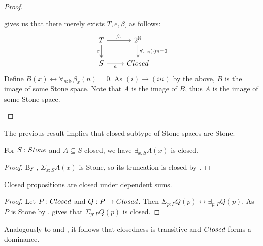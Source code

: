 \begin{proof}
\begin{itemize}
      gives us that there merely exists $T, e, \beta_\cdot$ as follows:
     \begin{equation}
       \begin{tikzcd}
         T \arrow[r,"\beta_\cdot"] \arrow[d, two heads,swap,"e"] & 2^\mathbb N 
         \arrow[d,two heads, "\forall_{n:\mathbb N} (\cdot)n = 0"] \\
         S \arrow[r,swap,"a"] & \Closed
       \end{tikzcd} 
     \end{equation} 
     Define $B(x) \leftrightarrow \forall_{n:\mathbb N} \beta_x(n) = 0$. 
     As $(i) \to (iii)$ by the above, $B$ is the image of some Stone space. 
     Note that $A$ is the image of $B$, 
     thus $A$ is the image of some Stone space. 
\end{itemize} 
\end{proof} 

\begin{remark}\label{ClosedInStoneIsStone}
The previous result implies that closed subtype of Stone spaces are Stone.
\end{remark}

\begin{corollary}\label{InhabitedClosedSubSpaceClosed}
  For $S:\Stone$ and $A\subseteq S$ closed, we have 
  $\exists_{x:S} A(x)$ is closed. 
\end{corollary}
\begin{proof}
  By , $\Sigma_{x:S}A(x)$ is Stone, 
  so its truncation is closed by .
\end{proof}

\begin{corollary}\label{ClosedDependentSums}
  Closed propositions are closed under dependent sums. 
\end{corollary}
\begin{proof}
  Let $P:\Closed$ and $Q:P \to \Closed$. 
  Then $\Sigma_{p:P} Q(p) \leftrightarrow \exists_{p:P} Q(p)$.
  As $P$ is Stone by , 
   gives that $\Sigma_{p:P} Q(p)$ is closed. 
\end{proof}
\begin{remark}\label{ClosedDominance}\label{ClosedTransitive}
  Analogously to  and , it follows that 
  closedness is transitive and $\Closed$ forms a dominance. 
\end{remark}

